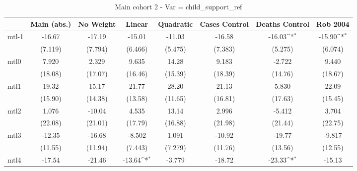 \documentclass{article}
\begin{document}
{
\def\sym#1{\ifmmode^{#1}\else\(^{#1}\)\fi}
\begin{longtable}{l*{7}{c}}
\caption{Main cohort 2 - Var = child\_support\_ref}\\
\hline\hline\endfirsthead\hline\endhead\hline\endfoot\endlastfoot
                &\multicolumn{1}{c}{Main (abs.)}&\multicolumn{1}{c}{No Weight}&\multicolumn{1}{c}{Linear}&\multicolumn{1}{c}{Quadratic}&\multicolumn{1}{c}{Cases Control}&\multicolumn{1}{c}{Deaths Control}&\multicolumn{1}{c}{Rob 2004}\\
\hline
mtl-1           &   -16.67         &   -17.19         &   -15.01         &   -11.03         &   -16.58         &   -16.03\sym{*}  &   -15.90\sym{*}  \\
                &  (7.119)         &  (7.794)         &  (6.466)         &  (5.475)         &  (7.383)         &  (5.275)         &  (6.074)         \\
mtl0            &    7.920         &    2.329         &    9.635         &    14.28         &    9.183         &   -2.722         &    9.440         \\
                &  (18.08)         &  (17.07)         &  (16.46)         &  (15.39)         &  (18.39)         &  (14.76)         &  (18.67)         \\
mtl1            &    19.32         &    15.17         &    21.77         &    28.20         &    21.13         &    5.830         &    22.09         \\
                &  (15.90)         &  (14.38)         &  (13.58)         &  (11.65)         &  (16.81)         &  (17.63)         &  (15.45)         \\
mtl2            &    1.076         &   -10.04         &    4.535         &    13.14         &    2.996         &   -5.412         &    3.704         \\
                &  (22.08)         &  (21.01)         &  (17.79)         &  (16.88)         &  (21.98)         &  (21.44)         &  (22.75)         \\
mtl3            &   -12.35         &   -16.68         &   -8.502         &    1.091         &   -10.92         &   -19.77         &   -9.817         \\
                &  (11.55)         &  (11.94)         &  (7.443)         &  (7.279)         &  (11.76)         &  (13.56)         &  (12.55)         \\
mtl4            &   -17.54         &   -21.46         &   -13.64\sym{*}  &   -3.779         &   -18.72         &   -23.33\sym{*}  &   -15.13         \\

\end{longtable}}
\end{document}
